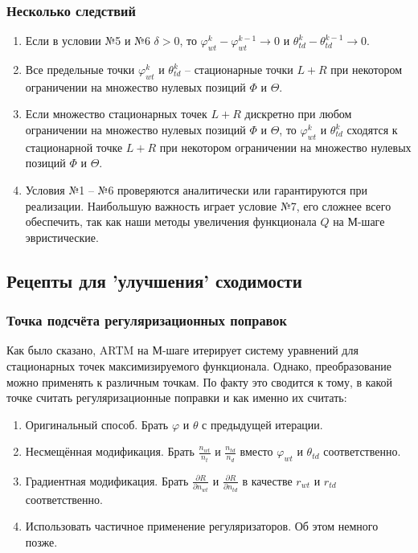 \documentclass[utf8]{beamer}
\renewcommand{\phi}{\varphi}
\begin{document}
\begin{frame}
\frametitle{Несколько следствий}
\begin{enumerate}
\item  Если в условии №5 и №6 $\delta > 0$, то $\phi^k_{wt} - \phi_{wt}^{k-1} \to 0$ и $\theta^k_{td} - \theta^{k-1}_{td} \to 0$.
\item Все предельные точки $\phi^k_{wt}$ и $\theta^k_{td}$ -- стационарные точки $L + R$ при некотором ограничении на множество нулевых позиций $\Phi$ и $\Theta$.
\item Если множество стационарных точек $L + R$ дискретно при любом ограничении на множество нулевых позиций $\Phi$ и $\Theta$, то $\phi_{wt}^k$ и $\theta_{td}^k$ сходятся к стационарной точке $L+R$ при некотором ограничении  на множество нулевых позиций $\Phi$ и $\Theta$.
\item Условия №1 -- №6 проверяются аналитически или гарантируются при реализации. Наибольшую важность играет условие №7, его сложнее всего обеспечить, так как наши методы увеличения функционала $Q$ на М-шаге эвристические.
\end{enumerate}
\end{frame}

	
\subsection{Рецепты для 'улучшения' сходимости}

\begin{frame}
\frametitle{Точка подсчёта регуляризационных поправок}
Как было сказано, ARTM на М-шаге итерирует систему уравнений для стационарных точек максимизируемого функционала. Однако, преобразование можно применять к различным точкам. По факту это сводится к тому, в какой точке считать регуляризационные поправки и как именно их считать:
\medskip

\begin{enumerate}
\item Оригинальный способ. Брать $\phi$ и $\theta$ с предыдущей итерации.
\item Несмещённая модификация. Брать $\frac{n_{wt}}{n_t}$ и $ \frac{n_{td}}{n_d}$ вместо $\phi_{wt}$ и $\theta_{td}$ соответственно.
\item Градиентная модификация. Брать $\frac{\partial{R}}{\partial{n_{wt}}} $ и $ \frac{\partial{R}}{\partial{n_{td}}}$ в качестве $r_{wt}$ и $r_{td}$ соответственно.
\item Использовать частичное применение регуляризаторов. Об этом немного позже.
\end{enumerate}
\end{frame}
	
\end{document}
